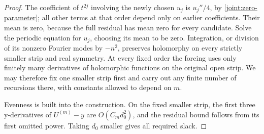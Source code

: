 \begin{proof}
The coefficient of \(t^{2j}\) involving the newly chosen \(u_j\) is
\(u_j''/4\), by \eqref{joint:zero-parameter}; all other terms at that
order depend only on earlier coefficients. Their mean is zero, because
the full residual has mean zero for every candidate. Solve the periodic
equation for \(u_j\), choosing its mean to be zero. Integration, or
division of its nonzero Fourier modes by \(-n^2\), preserves
holomorphy on every strictly smaller strip and real symmetry. At every
fixed order the forcing uses only finitely many derivatives of
holomorphic functions on the original open strip. We may therefore fix
one smaller strip first and carry out any finite number of recursions
there, with constants allowed to depend on \(m\).

Evenness is built into the construction. On the fixed smaller strip,
the first three y-derivatives of \(U^{(m)}-y\) are \(O(C_m d_0^2)\),
and the residual bound follows from its first omitted power. Taking
\(d_0\) smaller gives all required slack.
\end{proof}


